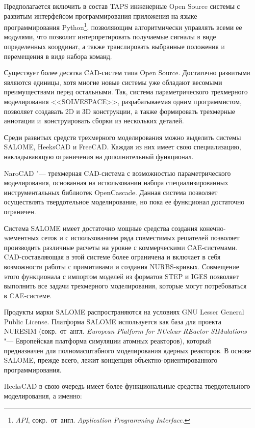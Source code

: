 Предполагается включить в состав \foreignlanguage{english}{TAPS} инженерные Open Source системы с развитым интерфейсом программирования приложения на языке программирования \foreignlanguage{english}{Python}\footnote{\textit{API}, сокр.~от~англ. \textit{Application Programming Interface}.}, позволяющим алгоритмически управлять всеми ее модулями, что позволит интерпретировать получаемые сигналы в виде определенных координат, а также транслировать выбранные положения и перемещения в виде набора команд.

Существует более десятка CAD-систем типа Open Source. Достаточно развитыми являются единицы, хотя многие новые системы уже обладают весомыми преимуществами перед остальными. Так, система параметрического трехмерного моделирования <<SOLVESPACE>>, разрабатываемая одним программистом, позволяет создавать 2D и 3D конструкции, а также формировать трехмерные аннотации и~конструировать сборки из нескольких деталей.

Среди развитых средств трехмерного моделирования можно выделить системы SALOME, HeeksCAD и FreeCAD. Каждая из них имеет свою специализацию, накладывающую ограничения на дополнительный функционал.

NaroCAD "--- трехмерная CAD-система с возможностью параметрического моделирования, основанная на использовании набора специализированных инструментальных библиотек OpenCascade. Данная система позволяет осуществлять твердотельное моделирование, но пока ее функционал достаточно ограничен.

Система SALOME имеет достаточно мощные средства создания конечно-элементных сеток и с использованием ряда совместимых решателей позволяет производить различные расчеты на уровне с коммерческими CAE-системами. CAD-составляющая в этой системе более ограничена и включает в себя возможности работы с примитивами и создания NURBS-кривых. Совмещение этого функционала с импортом моделей из форматов STEP и IGES позволяет выполнить все задачи трехмерного моделирования, которые могут потребоваться в CAE-системе.

Продукты марки SALOME распространяются на условиях GNU Lesser General Public License. Платформа SALOME используется как база для проекта NURESIM (сокр.~от~англ. \textit{European Platform for NUclear REactor SIMulations} "--- Европейская платформа симуляции атомных реакторов), который предназначен для полномасштабного моделирования ядерных реакторов. В основе SALOME, прежде всего, лежит концепция объектно-ориентированного программирования.

HeeksCAD в свою очередь имеет более функциональные средства твердотельного моделирования, а именно:

